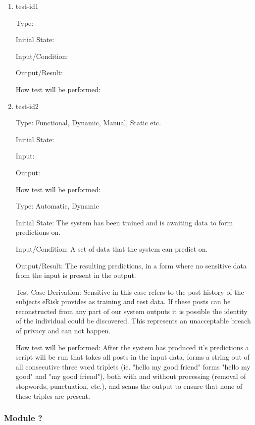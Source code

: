 \documentclass[12pt, titlepage]{article}
\begin{document}
\begin{enumerate}

\item{test-id1\\}

Type: 
					
Initial State: 
					
Input/Condition: 
					
Output/Result: 
					
How test will be performed: 
					
\item{test-id2\\}

Type: Functional, Dynamic, Manual, Static etc.
					
Initial State: 
					
Input: 
					
Output: 
					
How test will be performed: 

Type: Automatic, Dynamic
					
Initial State: The system has been trained and is awaiting data to form predictions on.
					
Input/Condition: A set of data that the system can predict on.
					
Output/Result: The resulting predictions, in a form where no sensitive data from the input is present in the output.

Test Case Derivation: Sensitive in this case refers to the post history of the subjects eRisk provides as training and test data. If these posts can be reconstructed from any part of our system outputs it is possible the identity of the individual could be discovered. This represents an unacceptable breach of privacy and can not happen.
					
How test will be performed: After the system has produced it's predictions a script will be run that takes all posts in the input data, forms a string out of all consecutive three word triplets (ie. "hello my good friend" forms "hello my good" and "my good friend"), both with and without processing (removal of stopwords, punctuation, etc.), and scans the output to ensure that none of these triples are present.

\end{enumerate}

\subsubsection{Module ?}
\end{document}
